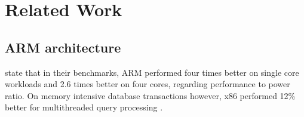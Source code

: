 \section{Related Work}

\subsection{ARM architecture}

\citeauthor{maqbool2015evaluating} 
state that in their benchmarks,
ARM performed four times better on single core workloads and
2.6 times better on four cores, 
regarding performance to power ratio.
On memory intensive database transactions however, 
x86 performed 12\% better for multithreaded query processing
\cite{maqbool2015evaluating}.
